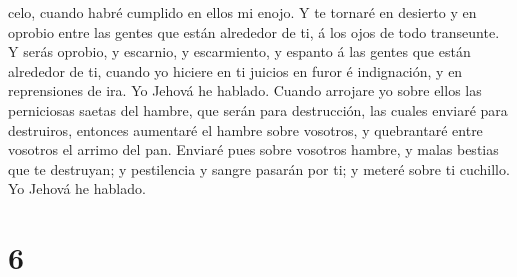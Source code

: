 celo, cuando habré cumplido en ellos mi enojo.  Y te
tornaré en desierto y en oprobio entre las gentes que están alrededor de
ti, á los ojos de todo transeunte.  Y serás oprobio, y
escarnio, y escarmiento, y espanto á las gentes que están alrededor de
ti, cuando yo hiciere en ti juicios en furor é indignación, y en
reprensiones de ira. Yo Jehová he hablado.  Cuando
arrojare yo sobre ellos las perniciosas saetas del hambre, que serán
para destrucción, las cuales enviaré para destruiros, entonces aumentaré
el hambre sobre vosotros, y quebrantaré entre vosotros el arrimo del
pan.  Enviaré pues sobre vosotros hambre, y malas bestias
que te destruyan; y pestilencia y sangre pasarán por ti; y meteré sobre
ti cuchillo. Yo Jehová he hablado.

\hypertarget{section-5}{%
\section{6}\label{section-5}}

